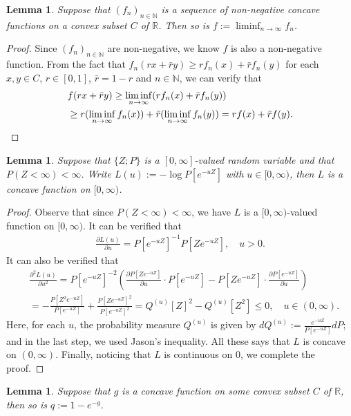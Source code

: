 \documentclass[12pt,a4paper]{amsart}
\numberwithin{equation}{section}
\theoremstyle{plain}
\newtheorem{lem}[thm]{Lemma}
\theoremstyle{definition}
\begin{document}
\begin{lem}
	\label{lem:ACL}
  Suppose that $(f_n)_{n \in \mathbb N}$ is a sequence of non-negative concave functions on a convex subset $C$ of $\mathbb R$.
  Then so is $f:= \liminf_{n\to \infty} f_n$.
\end{lem}

\begin{proof}
  Since $(f_n)_{n \in \mathbb N}$ are non-negative, we know $f$ is also a non-negative function.
  From the fact that
\(
  f_n(rx+\bar r y) \geq r f_n(x) + \bar r f_n(y)
\)
for each $x,y\in C$, $r\in [0,1]$, $\bar r = 1 - r$ and $n \in \mathbb N$, we can verify that
\begin{align}
	& f(rx+ \bar r y) 
   \geq \liminf_{n\to \infty} (r f_n(x) + \bar r f_n(y))
   \\ & \geq r (\liminf_{n\to \infty} f_n(x)) + \bar r (\liminf_{n\to \infty} f_n(y)) 
    = rf(x) + \bar r f(y).
        \qedhere
\end{align}
\end{proof}

\begin{lem}
  \label{lem:ACP}
  Suppose that $\{Z; P\}$ is a $[0,\infty]$-valued random variable and that $P(Z < \infty)< \infty$. 
  Write $L(u):= - \log P[e^{- u Z}]$ with $u \in [0,\infty)$, then $L$ is a concave function on $[0,\infty)$.
\end{lem} 
\begin{proof}
  Observe that since $P(Z < \infty)< \infty$, we have $L$ is a $[0,\infty)$-valued function on $[0,\infty)$.
	It can be verified that
  \begin{align}
    \frac{\partial L(u)}{\partial u} = P[e^{-u Z}]^{-1} P[Ze^{- u Z}]
    , \quad u > 0.
  \end{align}
  It can also be verified that
  \begin{align}
    & \frac{\partial^2 L(u)}{\partial u^2}
    = P[e^{-uZ}]^{-2}( \frac{\partial P[Ze^{-uZ}]}{\partial u} \cdot P[e^{-uZ}] - P[Ze^{-uZ}] \cdot \frac{\partial P[e^{-uZ}]}{\partial u}) \\
    & = - \frac{P[Z^2 e^{-uZ}]}{P[e^{-uZ}]} + \frac{P[Ze^{-uZ}]^2}{P[e^{-uZ}]^2} 
= Q^{(u)}[Z]^2 - Q^{(u)}[Z^2] 
      \leq 0
      , \quad u \in (0,\infty).
  \end{align}
  Here, for each $u$, the probability measure $Q^{(u)}$ is given by $dQ^{(u)}:= \frac{e^{-uZ}}{P[e^{-uZ}]} dP$; and in the last step, we used Jason's inequality.
  All these says that $L$ is concave on $(0,\infty)$.
  Finally, noticing that $L$ is continuous on $0$, we complete the proof.
\end{proof}
\begin{lem}
	\label{lem:ACE}
  Suppose that $g$ is a concave function on some convex subset $C$ of $\mathbb R$, then so is $q:= 1- e^{-g}$.
\end{lem}
\end{document}
